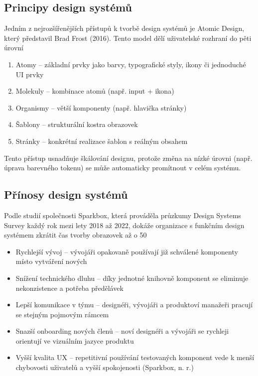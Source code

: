 \subsection{Principy design systémů}
Jedním z nejrozšířenějších přístupů k tvorbě design systémů je Atomic Design, který představil Brad Frost (2016). Tento model dělí uživatelské rozhraní do pěti úrovní
\begin{enumerate}
    \item Atomy – základní prvky jako barvy, typografické styly, ikony či jednoduché UI prvky
    \item Molekuly – kombinace atomů (např. input + ikona)
    \item Organismy – větší komponenty (např. hlavička stránky)
    \item Šablony – strukturální kostra obrazovek
    \item Stránky – konkrétní realizace šablon s reálným obsahem
\end{enumerate}
Tento přístup usnadňuje škálování designu, protože změna na nízké úrovni (např. úprava barevného tokenu) se může automaticky promítnout v celém systému.

\subsection{Přínosy design systémů}
Podle studií společnosti Sparkbox, která prováděla průzkumy Design Systems Survey každý rok mezi lety 2018 až 2022, dokáže organizace s funkčním design systémem zkrátit čas tvorby obrazovek až o 50 %
\begin{itemize}
    \item Rychlejší vývoj – vývojáři opakovaně používají již schválené komponenty místo vytváření nových
    \item Snížení technického dluhu – díky jednotné knihovně komponent se eliminuje nekonzistence a potřeba předělávek
    \item Lepší komunikace v týmu – designéři, vývojáři a produktoví manažeři pracují se stejným pojmovým rámcem
    \item Snazší onboarding nových členů – noví designéři a vývojáři se rychleji orientují ve vizuálním jazyce produktu
    \item Vyšší kvalita UX – repetitivní používání testovaných komponent vede k menší chybovosti uživatelů a vyšší spokojenosti (Sparkbox, n. r.)
\end{itemize}
    


